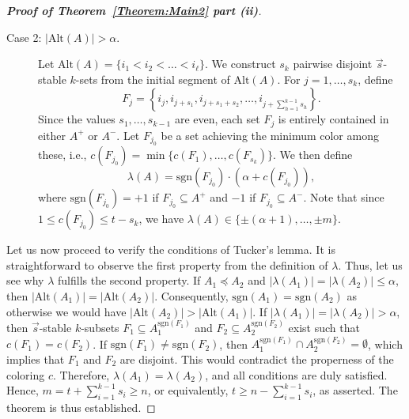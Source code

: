 \documentclass[preprint,12pt,3p]{elsarticle}
\begin{document}
\begin{proof}[\textbf{Proof of Theorem~\ref{Theorem:Main2} part (ii)}]
\begin{description}
    \item[Case 2: $|\mathrm{Alt}(A)| > \alpha$.] 
        Let $\mathrm{Alt}(A) = \{i_1 < i_2 < \dots < i_\ell\}$. We construct $s_k$ pairwise disjoint $\vec{s}$-stable $k$-sets from the initial segment of $\mathrm{Alt}(A)$. For $j = 1, \dots, s_k$, define
        \[
        F_j = \left\{ i_j, i_{j + s_1}, i_{j + s_1 + s_2}, \dots, i_{j + \sum_{h=1}^{k-1} s_h} \right\}.
        \]
        Since the values $s_1, \dots, s_{k-1}$ are even, each set $F_j$ is entirely contained in either $A^+$ or $A^-$. Let $F_{j_0}$ be a set achieving the minimum color among these, i.e., $c(F_{j_0}) = \min \{ c(F_1), \dots, c(F_{s_k}) \}$. We then define
        \[
        \lambda(A) = \mathrm{sgn}(F_{j_0}) \cdot \left(\alpha + c(F_{j_0})\right),
        \]
        where $\mathrm{sgn}(F_{j_0}) = +1$ if $F_{j_0} \subseteq A^+$ and $-1$ if $F_{j_0} \subseteq A^-$. Note that since $1\leq c(F_{j_0}) \leq t - s_k$, we have $\lambda(A) \in \{\pm(\alpha+1), \dots, \pm m\}$.
\end{description}
Let us now proceed to verify the conditions of Tucker's lemma. It is straightforward to observe the first property from the definition of $\lambda$. Thus, let us see why $\lambda$ fulfills the second property. If $A_1 \preceq A_2$ and $|\lambda(A_1)| = |\lambda(A_2)| \le \alpha$, then $|\mathrm{Alt}(A_1)| = |\mathrm{Alt}(A_2)|$. Consequently, $\mathrm{sgn}(A_1) = \mathrm{sgn}(A_2)$ as otherwise we would have $|\mathrm{Alt}(A_2)| > |\mathrm{Alt}(A_1)|$. If $|\lambda(A_1)| = |\lambda(A_2)| > \alpha$, then $\vec{s}$-stable $k$-subsets $F_1 \subseteq A_1^{\mathrm{sgn}(F_1)}$ and $F_2 \subseteq A_2^{\mathrm{sgn}(F_2)}$ exist such that $c(F_1) = c(F_2)$. If $\mathrm{sgn}(F_1) \ne \mathrm{sgn}(F_2)$, then $A_1^{\mathrm{sgn}(F_1)} \cap A_2^{\mathrm{sgn}(F_2)} = \emptyset$, which implies that $F_1$ and $F_2$ are disjoint. This would contradict the properness of the coloring $c$. Therefore, $\lambda(A_1) = \lambda(A_2)$, and all conditions are duly satisfied. Hence, $m = t + \sum_{i=1}^{k-1} s_i \ge n$, or equivalently, $t \ge n - \sum_{i=1}^{k-1} s_i$, as asserted. The theorem is thus established.

    
\end{proof}
\end{document}
